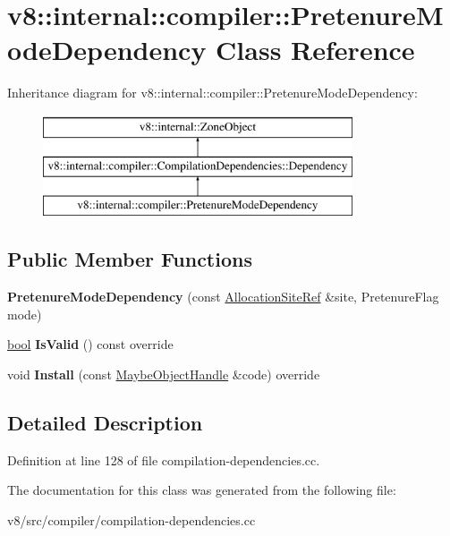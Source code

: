 \hypertarget{classv8_1_1internal_1_1compiler_1_1PretenureModeDependency}{}\section{v8\+:\+:internal\+:\+:compiler\+:\+:Pretenure\+Mode\+Dependency Class Reference}
\label{classv8_1_1internal_1_1compiler_1_1PretenureModeDependency}
Inheritance diagram for v8\+:\+:internal\+:\+:compiler\+:\+:Pretenure\+Mode\+Dependency\+:\begin{figure}[H]
\begin{center}
\leavevmode
\includegraphics[height=3.000000cm]{classv8_1_1internal_1_1compiler_1_1PretenureModeDependency}
\end{center}
\end{figure}
\subsection*{Public Member Functions}
\begin{DoxyCompactItemize}
\item 
\mbox{\label{classv8_1_1internal_1_1compiler_1_1PretenureModeDependency_a8d9b0585e68f326cbd44567f7a239378}} 
{\bfseries Pretenure\+Mode\+Dependency} (const \mbox{\hyperlink{classv8_1_1internal_1_1compiler_1_1AllocationSiteRef}{Allocation\+Site\+Ref}} \&site, Pretenure\+Flag mode)
\item 
\mbox{\label{classv8_1_1internal_1_1compiler_1_1PretenureModeDependency_ada7a47a11445c63301445106992bc777}} 
\mbox{\hyperlink{classbool}{bool}} {\bfseries Is\+Valid} () const override
\item 
\mbox{\label{classv8_1_1internal_1_1compiler_1_1PretenureModeDependency_a28521a9c0624f7fe3f48f635cb4cf426}} 
void {\bfseries Install} (const \mbox{\hyperlink{classv8_1_1internal_1_1MaybeObjectHandle}{Maybe\+Object\+Handle}} \&code) override
\end{DoxyCompactItemize}


\subsection{Detailed Description}


Definition at line 128 of file compilation-\/dependencies.\+cc.



The documentation for this class was generated from the following file\+:\begin{DoxyCompactItemize}
\item 
v8/src/compiler/compilation-\/dependencies.\+cc\end{DoxyCompactItemize}
